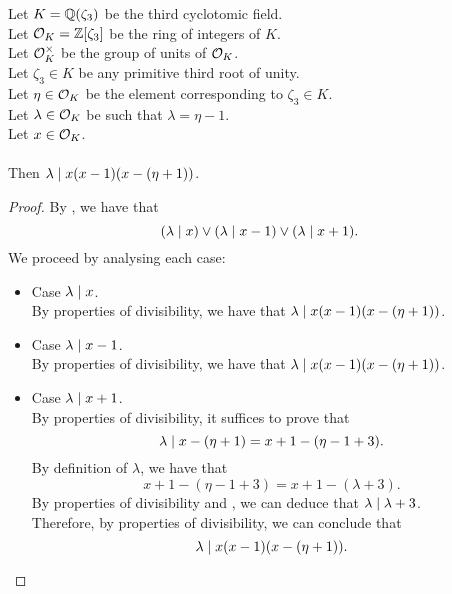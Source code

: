 \begin{lemma}
    \label{lmm:lambda_dvd_mul_sub_one_mul_sub_eta_add_one}
    \leanok
    Let $K = \mathbb{Q}(\zeta_3)$ be the third cyclotomic field. \\
    Let $\mathcal{O}_K = \mathbb{Z}[\zeta_3]$ be the ring of integers of $K$. \\
    Let $\mathcal{O}^\times_K$ be the group of units of $\mathcal{O}_K$. \\
    Let $\zeta_3 \in K$ be any primitive third root of unity. \\
    Let $\eta \in \mathcal{O}_K$ be the element corresponding to $\zeta_3 \in K$. \\
    Let $\lambda \in \mathcal{O}_K$ be such that $\lambda = \eta -1$. \\
    Let $x \in \mathcal{O}_K$. \\\\
    Then $\lambda \mid x(x - 1)(x - (\eta + 1))$.
\end{lemma}
\begin{proof}
    \leanok
    By , we have that
    $$(\lambda \mid x) \lor (\lambda \mid x-1) \lor (\lambda \mid x+1).$$
    We proceed by analysing each case:
    \begin{itemize}
        \item Case $\lambda \mid x$. \\
              By properties of divisibility, we have that
              $\lambda \mid x(x - 1)(x - (\eta + 1))$.
        \item Case $\lambda \mid x-1$. \\
              By properties of divisibility, we have that
              $\lambda \mid x(x - 1)(x - (\eta + 1))$.
        \item Case $\lambda \mid x+1$.\\
              By properties of divisibility, it suffices to prove that
              $$\lambda \mid x - (\eta + 1) = x + 1 - (\eta - 1 + 3).$$
              By definition of $\lambda$, we have that
              $$x + 1 - (\eta - 1 + 3) = x + 1 - (\lambda + 3).$$
              By properties of divisibility and , we can deduce that
              $\lambda \mid \lambda + 3$.\\
              Therefore, by properties of divisibility, we can conclude that
              $$\lambda \mid x(x - 1)(x - (\eta + 1)).$$
    \end{itemize}
\end{proof}

